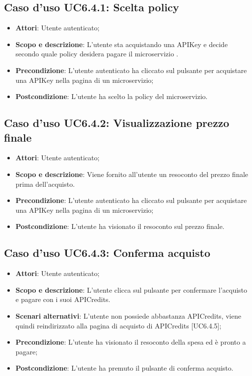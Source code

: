 \documentclass[12pt,a4paper,titlepage]{article}
\begin{document}
	\subsection{Caso d'uso UC6.4.1: Scelta policy}
	\label{UC6.4.1}
	\begin{itemize}
		\item \textbf{Attori}: Utente autenticato;
		\item \textbf{Scopo e descrizione}: L'utente sta acquistando una APIKey e decide secondo quale policy desidera pagare il microservizio .
		\item \textbf{Precondizione}: L'utente autenticato ha cliccato sul pulsante per acquistare una APIKey nella pagina di un microservizio;
		\item \textbf{Postcondizione}: L'utente ha scelto la policy del microservizio.
	\end{itemize}
	\subsection{Caso d'uso UC6.4.2: Visualizzazione prezzo finale}
	\label{UC6.4.2}
	\begin{itemize}
		\item \textbf{Attori}: Utente autenticato;
		\item \textbf{Scopo e descrizione}: Viene fornito all'utente un resoconto del prezzo finale prima dell'acquisto. 
		\item \textbf{Precondizione}: L'utente autenticato ha cliccato sul pulsante per acquistare una APIKey nella pagina di un microservizio;
		\item \textbf{Postcondizione}: L'utente ha visionato il resoconto sul prezzo finale.
	\end{itemize}
	\subsection{Caso d'uso UC6.4.3: Conferma acquisto}
	\label{UC6.4.3}
	\begin{itemize}
		\item \textbf{Attori}: Utente autenticato;
		\item \textbf{Scopo e descrizione}: L'utente clicca sul pulsante per confermare l'acquisto e pagare con i suoi APICredits.
		\item \textbf{Scenari alternativi}:
		L'utente non possiede abbastanza APICredits, viene quindi reindirizzato alla pagina di acquisto di APICredits [UC6.4.5];
		\item \textbf{Precondizione}: L'utente ha visionato il resoconto della spesa ed è pronto a pagare;
		\item \textbf{Postcondizione}: L'utente ha premuto il pulsante di conferma acquisto.
	\end{itemize}
\end{document}
